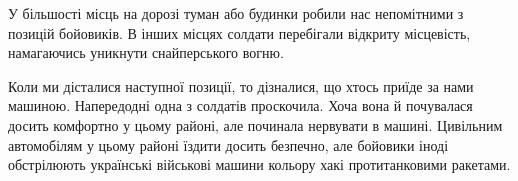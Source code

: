 У більшості місць на дорозі туман або будинки робили нас непомітними з позицій
бойовиків. В інших місцях солдати перебігали відкриту місцевість, намагаючись
уникнути снайперського вогню.

Коли ми дісталися наступної позиції, то дізналися, що хтось приїде за нами
машиною. Напередодні одна з солдатів проскочила. Хоча вона й почувалася досить
комфортно у цьому районі, але починала нервувати в машині. Цивільним
автомобілям у цьому районі їздити досить безпечно, але бойовики іноді
обстрілюють українські військові машини кольору хакі протитанковими ракетами.


